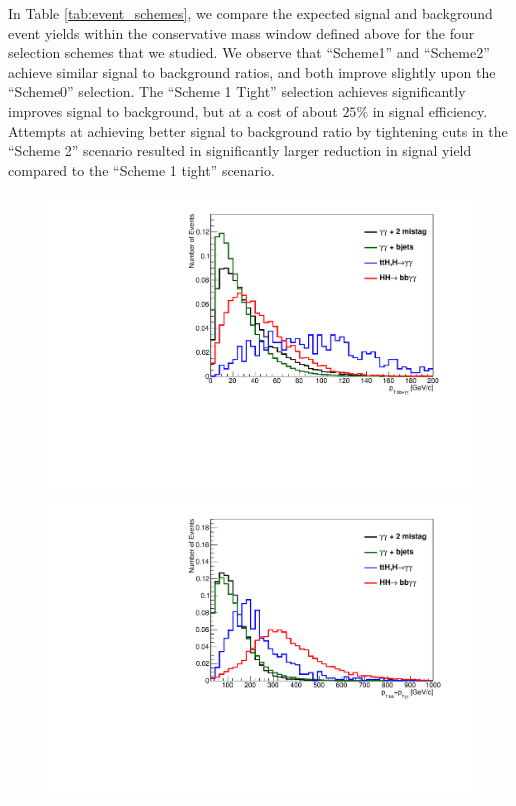 \documentclass{cmspaper}
\begin{document}
In Table \ref{tab:event_schemes}, we compare the expected signal and background event yields
within the conservative mass window defined above for the four selection schemes that we studied. 
We observe that ``Scheme1'' and ``Scheme2'' achieve similar signal to background ratios, and both
improve slightly upon the ``Scheme0'' selection. The ``Scheme 1 Tight'' selection achieves
significantly improves signal to background, but at a cost of about $25\%$ in signal efficiency.
Attempts at achieving better signal to background ratio by tightening cuts in the ``Scheme 2''
scenario resulted in significantly larger reduction in signal yield compared to the ``Scheme 1 tight''
scenario. 

\begin{figure}
\centering
\includegraphics[scale=0.35, angle=0]{figures/bbggPt_ps_normalized.pdf}	
\includegraphics[scale=0.35, angle=0]{figures/SumbbggPt_ps_normalized.pdf}	

\end{figure}
\end{document}
